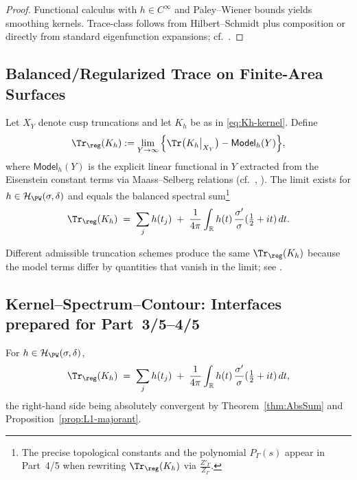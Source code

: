 \begin{proof}
Functional calculus with $h\in C^\infty$ and Paley–Wiener bounds yields smoothing kernels. Trace-class follows from Hilbert–Schmidt plus composition or directly from standard eigenfunction expansions; cf.\ \cite{HormanderI, ReedSimonI}. %
\end{proof}

\subsection{Balanced/Regularized Trace on Finite-Area Surfaces} \label{subsec:balanced-trace} \relax \hspace{0pt} %

\begin{definition} \label{def:TraceReg} %
Let $X_Y$ denote cusp truncations and let $K_h$ be as in \eqref{eq:Kh-kernel}. Define
\begin{equation}\label{eq:TraceReg}
  \Tr_{\reg}(K_h)
  := \lim_{Y\to\infty}
     \Big\{\Tr\big(K_h\big|_{X_Y}\big) - \mathsf{Model}_h(Y)\Big\}, %
\end{equation}
where $\mathsf{Model}_h(Y)$ is the explicit linear functional in $Y$ extracted from the Eisenstein constant terms via Maass–Selberg relations (cf.\ \cite[§§3–5]{HejhalII}, \cite{LaxPhillips}). The limit exists for $h\in\mathcal{H}_{\PW}(\sigma,\delta)$ and equals the balanced spectral sum\footnote{The precise topological constants and the polynomial $P_\Gamma(s)$ appear in Part~4/5 when rewriting $\Tr_{\reg}(K_h)$ via $\tfrac{Z'_\Gamma}{Z_\Gamma}$.} %
\[
  \Tr_{\reg}(K_h) \;=\; \sum_j h(t_j) \;+\; \frac{1}{4\pi}\int_{\mathbb R} h(t)\,\frac{\sigma'}{\sigma}(\tfrac12+it)\,dt. %
\]
\end{definition}

\begin{remark} %
Different admissible truncation schemes produce the same $\Tr_{\reg}(K_h)$ because the model terms differ by quantities that vanish in the limit; see \cite{HejhalII, LaxPhillips}. %
\end{remark}

\subsection{Kernel–Spectrum–Contour: Interfaces prepared for Part~3/5–4/5} \label{subsec:interfaces} %

\begin{theorem} \label{thm:kernel-spectrum} %
For $h\in\mathcal{H}_{\PW}(\sigma,\delta)$,
\[
  \Tr_{\reg}(K_h) \;=\; \sum_j h(t_j) \;+\; \frac{1}{4\pi}\int_{\mathbb R} h(t)\,\frac{\sigma'}{\sigma}(\tfrac12+it)\,dt,
\]
the right-hand side being absolutely convergent by Theorem~\ref{thm:AbsSum} and Proposition~\ref{prop:L1-majorant}. %
\end{theorem}

